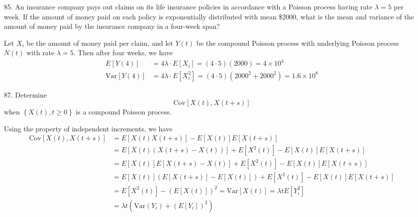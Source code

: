\documentclass{article}
\newcommand{\var}{\mathrm{Var}}
\newcommand{\cov}{\mathrm{Cov}}
\begin{document}
\begin{itemize}
	\item[85.] An insurance company pays out claims on its life insurance policies in accordance with a Poisson process having rate $\lambda=5$ per week. If the amount of money paid on each policy is exponentially distributed with mean \$2000, what is the mean and variance of the amount of money paid by the insurance company in a four-week span?
		\begin{soln}
			Let $X_i$ be the amount of money paid per claim, and let $Y(t)$ be the compound Poisson process with underlying Poisson process $N(t)$ with rate $\lambda=5.$ Then after four weeks, we have
			\begin{align*}
				E[Y(4)] &= 4\lambda \cdot E[X_i] = (4\cdot 5)(2000) = \boxed{4\times 10^4} \\
				\var\left[ Y(4) \right] &= 4\lambda \cdot E[X_i^2] = (4\cdot 5)(2000^2+2000^2) = \boxed{1.6\times 10^8}
			\end{align*}
		\end{soln}

	\item[87.] Determine
		\[\cov\left[ X(t), X(t+s) \right]\]
		when $\left\{ X(t), t\ge0 \right\}$ is a compound Poisson process.
		\begin{soln}
			Using the property of independent increments, we have
			\begin{align*}
				\cov\left[ X(t), X(t+s) \right] &= E\left[ X(t) X(t+s) \right] - E\left[ X(t) \right]E\left[ X(t+s) \right] \\
				&= E\left[ X(t) \left( X(t+s)-X(t) \right) \right] + E\left[ X^2(t) \right] - E[X(t)]E[X(t+s)] \\
				&= E[X(t)] E[X(t+s)-X(t)] + E[X^2(t)] - E[X(t)]E[X(t+s)] \\
				&= E[X(t)] \left( E[X(t+s)] - E[X(t)] \right) + E[X^2(t)] - E[X(t)]E[X(t+s)] \\
				&= E[X^2(t)] - \left( E[X(t)] \right)^2 = \var\left[ X(t) \right] = \lambda t E[Y_i^2] \\
				&= \boxed{\lambda t\left( \var(Y_i)+(E[Y_i])^2 \right)}
			\end{align*}
		\end{soln}


\end{itemize}
\end{document}
